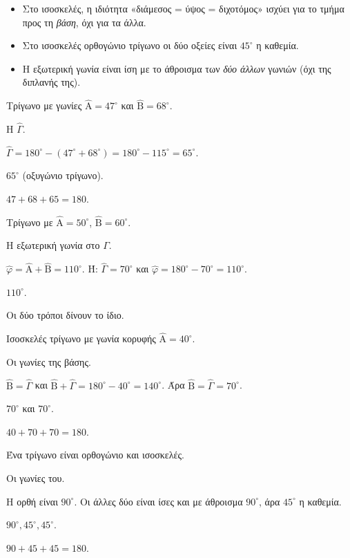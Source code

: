 \begin{prosoxi}
\begin{itemize}[leftmargin=1.2em,itemsep=0.3ex,topsep=2pt]
\item Στο ισοσκελές, η ιδιότητα «διάμεσος = ύψος = διχοτόμος» ισχύει για το τμήμα προς τη \emph{βάση}, όχι για τα άλλα.
\item Στο ισοσκελές ορθογώνιο τρίγωνο οι δύο οξείες είναι $45^\circ$ η καθεμία.
\item Η εξωτερική γωνία είναι ίση με το άθροισμα των \emph{δύο άλλων} γωνιών (όχι της διπλανής της).
\end{itemize}
\end{prosoxi}


\tixero Τρίγωνο με γωνίες $\hat{\mathrm{Α}}=47^\circ$ και $\hat{\mathrm{Β}}=68^\circ$.\par
\tithelo Η $\hat{\Gamma}$.\par
\possindeo $\hat{\Gamma}=180^\circ-(47^\circ+68^\circ)=180^\circ-115^\circ=65^\circ$.\par
\apantisi $65^\circ$ (οξυγώνιο τρίγωνο).\par
\elegxos $47+68+65=180$.

\tixero Τρίγωνο με $\hat{\mathrm{Α}}=50^\circ$, $\hat{\mathrm{Β}}=60^\circ$.\par
\tithelo Η εξωτερική γωνία στο $\Gamma$.\par
\possindeo $\hat{\varphi}=\hat{\mathrm{Α}}+\hat{\mathrm{Β}}=110^\circ$. Ή: $\hat{\Gamma}=70^\circ$ και $\hat{\varphi}=180^\circ-70^\circ=110^\circ$.\par
\apantisi $110^\circ$.\par
\elegxos Οι δύο τρόποι δίνουν το ίδιο.

\tixero Ισοσκελές τρίγωνο με γωνία κορυφής $\hat{\mathrm{Α}}=40^\circ$.\par
\tithelo Οι γωνίες της βάσης.\par
\possindeo $\hat{\mathrm{Β}}=\hat{\Gamma}$ και $\hat{\mathrm{Β}}+\hat{\Gamma}=180^\circ-40^\circ=140^\circ$. Άρα $\hat{\mathrm{Β}}=\hat{\Gamma}=70^\circ$.\par
\apantisi $70^\circ$ και $70^\circ$.\par
\elegxos $40+70+70=180$.

\tixero Ένα τρίγωνο είναι ορθογώνιο και ισοσκελές.\par
\tithelo Οι γωνίες του.\par
\possindeo Η ορθή είναι $90^\circ$. Οι άλλες δύο είναι ίσες και με άθροισμα $90^\circ$, άρα $45^\circ$ η καθεμία.\par
\apantisi $90^\circ,45^\circ,45^\circ$.\par
\elegxos $90+45+45=180$.

